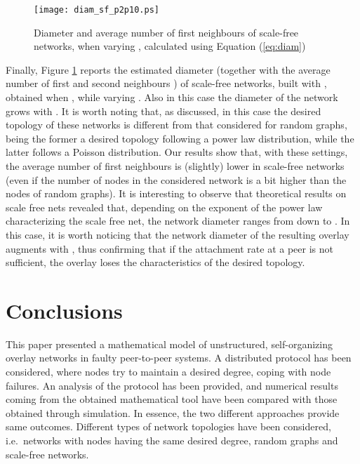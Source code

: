 \documentclass[a4paper,twosided]{article}
\begin{document}
\begin{figure}
   \centering
   \texttt{[image: diam\_sf\_p2p10.ps]}
   \caption{Diameter and average number of first neighbours of scale-free networks, when varying , calculated using Equation (\ref{eq:diam})}
   \label{fig:diam_sf}
\end{figure}

Finally, Figure \ref{fig:diam_sf} reports the estimated diameter (together with the average number of first and second neighbours ) of scale-free networks, built with , obtained when , while varying .
Also in this case the diameter of the network grows with . It is worth noting that, as discussed, in this case the desired topology of these networks is different from that considered for random graphs, being the former a desired topology following a power law distribution, while the latter follows a Poisson distribution. 
Our results show that, with these settings, the average number of first neighbours  is (slightly) lower in scale-free networks (even if the number of nodes in the considered network is a bit higher than the  nodes of random graphs). 
It is interesting to observe that theoretical results on scale free nets revealed that, depending on the exponent of the power law characterizing the scale free net, the network diameter ranges from  down to 
\cite{Verlag03structuralproperties,simutools,pyun,bollobas_diam}. 
In this case, it is worth noticing that the network diameter of the resulting overlay augments with , thus confirming that if the attachment rate at a peer is not sufficient, the overlay loses the characteristics of the desired topology.




\section{Conclusions}
\label{sec:conc}

This paper presented a mathematical model of unstructured, self-orga\-ni\-zing overlay networks in faulty peer-to-peer systems. A distributed protocol has been considered, where nodes try to maintain a desired degree, coping with node failures. 
An analysis of the protocol has been provided, and numerical results coming from the obtained mathematical tool have been compared with those obtained through simulation. In essence, the two different approaches provide same outcomes. Different types of network topologies have been considered, i.e.~networks with nodes having the same desired degree, random graphs and scale-free networks.
\end{document}
